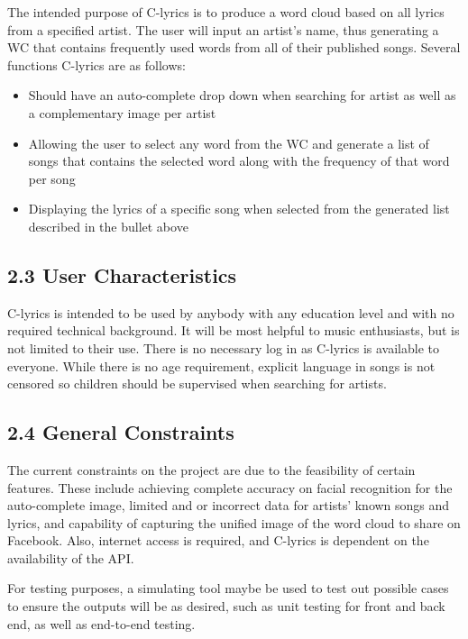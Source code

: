 \documentclass[]{article}
\begin{document}
The intended purpose of C-lyrics is to produce a word cloud based on all
lyrics from a specified artist. The user will input an artist's name,
thus generating a WC that contains frequently used words from all of
their published songs. Several functions C-lyrics are as follows:

\begin{itemize}
\itemsep1pt\parskip0pt
\item
  Should have an auto-complete drop down when searching for artist as
  well as a complementary image per artist
\item
  Allowing the user to select any word from the WC and generate a list
  of songs that contains the selected word along with the frequency of
  that word per song
\item
  Displaying the lyrics of a specific song when selected from the
  generated list described in the bullet above
\end{itemize}

\subsection{2.3 User Characteristics}\label{user-characteristics}

C-lyrics is intended to be used by anybody with any education level and
with no required technical background. It will be most helpful to music
enthusiasts, but is not limited to their use. There is no necessary log
in as C-lyrics is available to everyone. While there is no age
requirement, explicit language in songs is not censored so children
should be supervised when searching for artists.

\subsection{2.4 General Constraints}\label{general-constraints}

The current constraints on the project are due to the feasibility of
certain features. These include achieving complete accuracy on facial
recognition for the auto-complete image, limited and or incorrect data
for artists' known songs and lyrics, and capability of capturing the
unified image of the word cloud to share on Facebook. Also, internet
access is required, and C-lyrics is dependent on the availability of the
API.

For testing purposes, a simulating tool maybe be used to test out
possible cases to ensure the outputs will be as desired, such as unit
testing for front and back end, as well as end-to-end testing.
\end{document}
